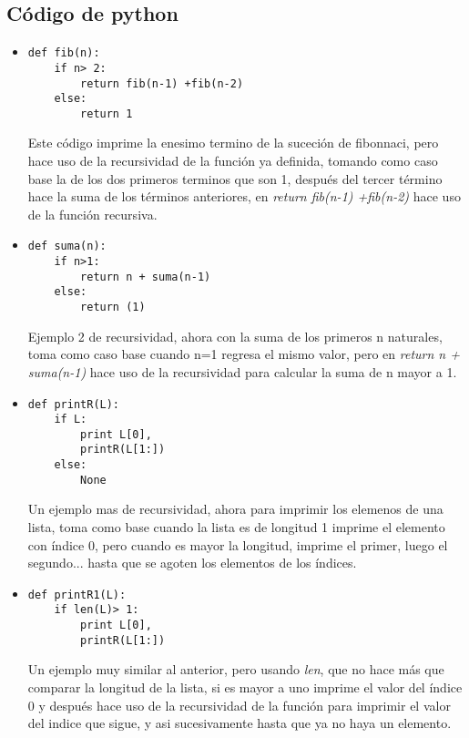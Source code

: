 \documentclass{book}
\begin{document}
	\subsection {Código de python}
	\begin{itemize}
		\item \begin{lstlisting}
def fib(n):
    if n> 2:
        return fib(n-1) +fib(n-2)
    else:
        return 1
		\end{lstlisting} Este código imprime la enesimo termino de la suceción de fibonnaci, pero hace uso de la recursividad de la función ya definida, tomando como caso base la de los dos primeros terminos que son 1, después del tercer término hace la suma de los términos anteriores, en \textit{return fib(n-1) +fib(n-2)} hace uso de la función recursiva.\\
		
		
		\item \begin{lstlisting}
def suma(n):
    if n>1:
        return n + suma(n-1)
    else:
        return (1)
		\end{lstlisting} Ejemplo 2 de recursividad, ahora con la suma de los primeros n naturales, toma como caso base cuando n=1 regresa el mismo valor, pero en \textit{return n + suma(n-1)} hace uso de la recursividad para calcular la suma de n mayor a 1.\\
		
		\item \begin{lstlisting}
def printR(L):
    if L:
        print L[0],
        printR(L[1:])
    else:
        None
		\end{lstlisting} Un ejemplo mas de recursividad, ahora para imprimir los elemenos de una lista, toma como base cuando la lista es de longitud 1 imprime el elemento con índice 0, pero cuando es mayor la longitud, imprime el primer, luego el segundo... hasta que se agoten los elementos de los índices.\\
		
		
		\item \begin{lstlisting}
def printR1(L):
    if len(L)> 1:
        print L[0],
        printR(L[1:])
		\end{lstlisting} Un ejemplo muy similar al anterior, pero usando \textit{len}, que no hace más que comparar la longitud de la lista, si es mayor a uno imprime el valor del índice 0 y después hace uso de la recursividad de la función para imprimir el valor del indice que sigue, y asi sucesivamente hasta que ya no haya un elemento.\\
		

\end{itemize}
\end{document}
